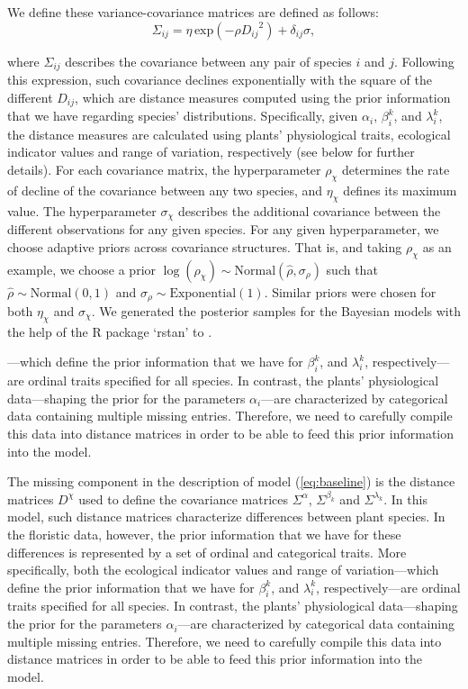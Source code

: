 \documentclass[11pt, a4paper]{article}
\begin{document}
We define these variance-covariance matrices are defined as follows:
\begin{equation} 
\Sigma_{ij} = \eta\,\text{exp}\left(-\rho {D_{ij}}^2\right) + \delta_{ij} \sigma ,
\label{eq:covariance}
\end{equation}

where $\Sigma_{ij}$ describes the covariance between any pair of species $i$ and $j$. Following this expression, such covariance declines exponentially with the square of the different $D_{ij}$, which are distance measures computed using the prior information that we have regarding species' distributions. Specifically, given $\alpha_i$, $\beta_i^k$, and $\lambda_i^k$, the distance measures are calculated using plants' physiological traits, ecological indicator values and range of variation, respectively (see below for further details). For each covariance matrix, the hyperparameter $\rho_{\chi}$ determines the rate of decline of the covariance between any two species, and $\eta_{\chi}$ defines its maximum value. The hyperparameter $\sigma_{\chi}$ describes the additional covariance between the different observations for any given species. For any given hyperparameter, we choose adaptive priors across covariance structures. That is, and taking $\rho_{\chi}$ as an example, we choose a prior $\log\left(\rho_{\chi}\right)\sim \text{Normal}\left(\hat{\rho}, \sigma_{\rho}\right)$ such that $\hat{\rho}\sim \text{Normal}\left(0, 1\right)$ and $\sigma_{\rho}\sim \text{Exponential}\left(1\right)$. Similar priors were chosen for both $\eta_{\chi}$ and $\sigma_{\chi}$. We generated the posterior samples for the Bayesian models with the help of the R package `rstan' to \citep{rstan}.



---which define the prior information that we have for $\beta_i^k$, and $\lambda_i^k$, respectively---are ordinal traits specified for all species. In contrast, the plants' physiological data---shaping the prior for the parameters $\alpha_i$---are characterized by categorical data containing multiple missing entries. Therefore, we need to carefully compile this data into distance matrices in order to be able to feed this prior information into the model. 


The missing component in the description of model (\ref{eq:baseline}) is the distance matrices $D^{\chi}$ used to define the covariance matrices $\Sigma^{\alpha}$, $\Sigma^{\beta_{k}}$ and $\Sigma^{\lambda_{k}}$. In this model, such distance matrices characterize differences between plant species. In the floristic data, however, the prior information that we have for these differences is represented by a set of ordinal and categorical traits. More specifically, both the ecological indicator values and range of variation---which define the prior information that we have for $\beta_i^k$, and $\lambda_i^k$, respectively---are ordinal traits specified for all species. In contrast, the plants' physiological data---shaping the prior for the parameters $\alpha_i$---are characterized by categorical data containing multiple missing entries. Therefore, we need to carefully compile this data into distance matrices in order to be able to feed this prior information into the model. 
\end{document}

